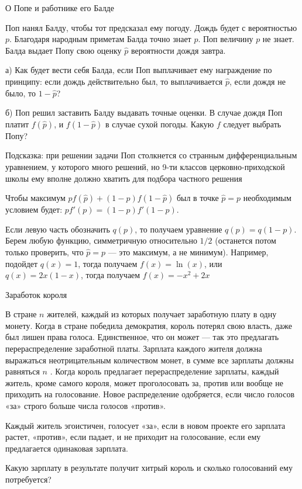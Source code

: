\begin{problem}
 О Попе и работнике его Балде \par
Поп нанял Балду, чтобы тот предсказал ему погоду. Дождь будет с
вероятностью $p$. Благодаря народным приметам Балда точно знает
$p$. Поп величину $p$ не знает. Балда выдает Попу
свою оценку $\hat{p}$ вероятности дождя завтра. \par
а) Как будет вести себя Балда, если Поп выплачивает ему
награждение по принципу: если дождь действительно был, то
выплачивается $\hat{p}$, если дождя не было, то
$1-\hat{p}$? \par
б) Поп решил заставить Балду выдавать точные оценки. В случае
дождя Поп платит $f(\hat{p})$, и $f(1-\hat{p})$ в случае
сухой погоды. Какую $f$ следует выбрать Попу? \par
Подсказка: при решении задачи Поп столкнется со странным
дифференциальным уравнением, у которого много решений, но 9-ти
классов церковно-приходской школы ему вполне должно хватить для
подбора частного решения



\begin{sol}

Чтобы максимум $p f(\hat{p})+(1-p)f(1-\hat{p})$ был в точке
$\hat{p}=p$ необходимым условием будет:
$pf'(p)=(1-p)f'(1-p)$. \par
Если левую часть обозначить $q(p)$, то получаем уравнение
$q(p)=q(1-p)$. Берем любую функцию, симметричную относительно
$1/2$ (останется потом только проверить, что $\hat{p}=p$ — это
максимум, а не минимум). Например, подойдет $q(x)=1$, тогда
получаем $f(x)=\ln(x)$, или $q(x)=2x(1-x)$, тогда получаем
$f(x)=-x^{2}+2x$
\end{sol}
\end{problem}



\begin{problem}
 Заработок короля\par
В стране  $n$  жителей, каждый из которых получает заработную плату в одну монету. Когда в стране победила демократия, король потерял свою власть, даже был лишен права голоса. Единственное, что он может — так это предлагать перераспределение заработной платы. Зарплата каждого жителя должна выражаться неотрицательным количеством монет, в сумме все зарплаты должны равняться  $n$ . Когда король предлагает перераспределение зарплаты, каждый житель, кроме самого короля, может проголосовать за, против или вообще не приходить на голосование. Новое распределение одобряется, если число голосов «за» строго больше числа голосов «против».\par
Каждый житель эгоистичен, голосует «за», если в новом проекте его зарплата растет, «против», если падает, и не приходит на голосование, если ему предлагается одинаковая зарплата.\par
Какую зарплату в результате получит хитрый король и сколько голосований ему потребуется?



\begin{sol}

\end{sol}
\end{problem}



